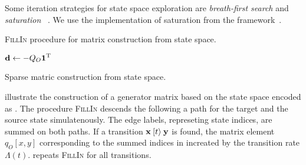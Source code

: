 Some iteration strategies for  state space exploration are
\emph{breath-first search} and \emph{saturation}%
~\citep{Ciardo:2006}. We use the implementation of saturation from the
 framework~\citep{TDK2010_Darvas,Petridotnet}.

\begin{algorithm}
  \caption{\textsc{FillIn} procedure for matrix construction from
     state space.}
  \label{alg:genstor:symbolic:fillin}
\end{algorithm}

\begin{algorithm}
  \;
  $\bm{\mathrm{d}} \gets -Q_O \bm{\mathrm{1}}^{\mathrm{T}}$\;
  \;
  \caption{Sparse matric construction from  state space.}
  \label{alg:genstor:symbolic:sparse}
\end{algorithm}

illustrate the construction of a generator matrix based on the state
space encoded as . The procedure \textsc{FillIn} descends
the  following a path for the target and the source
state simulatenously. The edge labels, represeting state indices, are
summed on both paths. If a transition $\bm{\mathrm{x}} \mathbin{[t\rangle} \bm{\mathrm{y}}$ is
found, the matrix element $q_O[x, y]$ corresponding to the summed
indices in increated by the transition rate
$\Lambda(t)$.  repeats
\textsc{FillIn} for all transitions.

